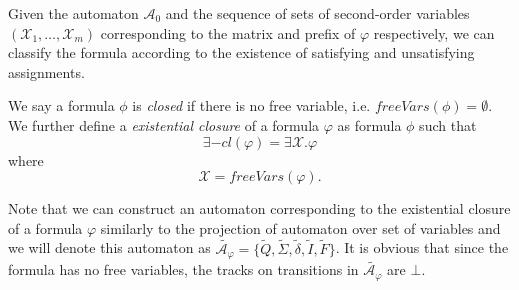% 

Given the automaton $\mathcal{A}_0$ and the sequence of sets of second-order
variables $(\mathcal{X}_1,\ldots,\mathcal{X}_m)$ corresponding to the matrix
and prefix of $\varphi$ respectively, we can classify the formula according to
the existence of satisfying and unsatisfying assignments.

\begin{defz}
We say a formula $\phi$ is \emph{closed} if there is no free variable, i.e.
$\mathit{freeVars}(\phi) = \emptyset$.
We further define a \emph{existential closure} of a formula $\varphi$ as formula
$\phi$ such that
\begin{equation}
 \exists-\mathit{cl}(\varphi) = \exists\mathcal{X}. \varphi
\end{equation}
where
\begin{equation}
 \mathcal{X} = \mathit{freeVars}(\varphi).
\end{equation}

Note that we can construct an automaton corresponding to the existential closure
of a formula $\varphi$ similarly to the projection of automaton over set of variables and we will
denote this automaton as $\widetilde{\mathcal{A_\varphi}} = \{\widetilde{Q},
\widetilde{\Sigma}, \widetilde{\delta}, \widetilde{I}, \widetilde{F}\}$. It is
obvious that since the formula has no free variables, the tracks on transitions
in $\widetilde{\mathcal{A}_\varphi}$ are $\bot$.
\end{defz}

